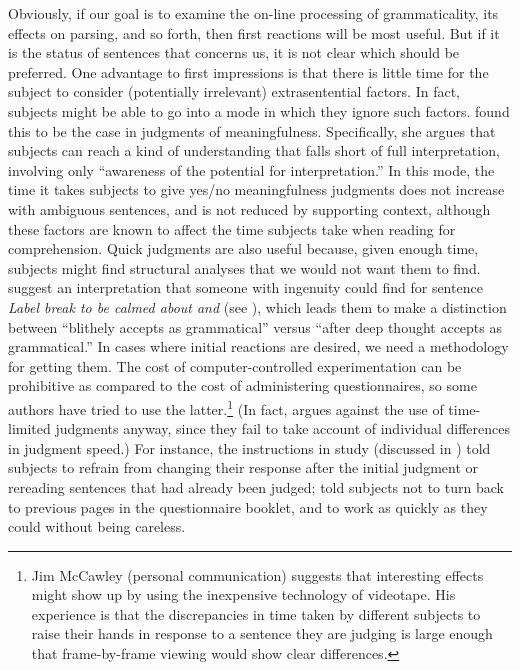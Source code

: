 Obviously, if our goal is to examine the on-line processing of grammaticality, its effects on parsing, and so forth, then first reactions will be most useful. But if it is the status of sentences that concerns us, it is not clear which should be preferred. One advantage to first impressions is that there is little time for the subject to consider (potentially irrelevant) extrasentential factors. In fact, subjects might be able to go into a mode in which they ignore such factors. \citet{Lachman1972} found this to be the case in judgments of meaningfulness. Specifically, she argues that subjects can reach a kind of understanding that falls short of full interpretation, involving only ``awareness of the potential for interpretation.'' In this mode, the time it takes subjects to give yes/no meaningfulness judgments does
not increase with ambiguous sentences, and is not reduced by supporting context, although these factors are known to affect the time subjects take when reading for comprehension. Quick judgments are also useful because, given enough time, subjects might find structural analyses that we would not want them to find. \citet{GleitmanEtAl1970} suggest an interpretation that someone with ingenuity could find for  sentence \textit{Label break to be calmed about and} (see ), which leads them to make a distinction between ``blithely accepts as grammatical'' versus ``after deep thought accepts as grammatical.'' In cases where initial reactions are desired, we need a methodology for getting them. The cost of computer-controlled experimentation can be prohibitive as compared to the cost of administering questionnaires, so some authors have tried to use the latter.\footnote{Jim McCawley (personal communication) suggests that interesting effects might show up by using the inexpensive technology of videotape. His experience is that the discrepancies in time taken by different subjects to raise their hands in response to a sentence they are judging is large enough that frame-by-frame viewing would show clear differences.}
 (In fact, \citet{Greenbaum1977c} argues against the use of time-limited judgments anyway, since they fail to take account of individual differences in judgment speed.) For instance, the instructions in  study (discussed in ) told subjects to refrain from changing their response after the initial judgment or rereading sentences that had already been judged; \citet{Greenbaum1977b} told subjects not to turn back to previous pages in the questionnaire booklet, and to work as quickly as they could without being careless.

